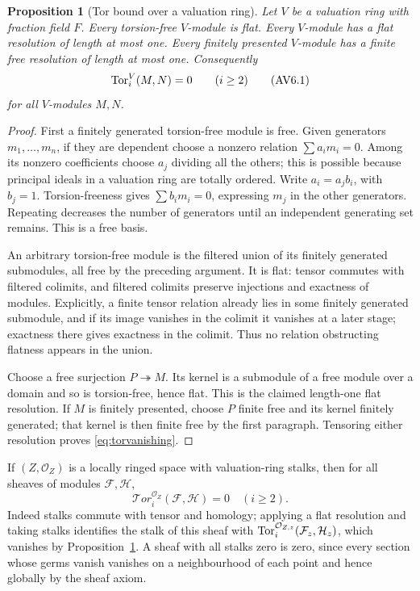 \documentclass[11pt,a4paper]{article}
\newtheorem{proposition}[theorem]{Proposition}
\theoremstyle{definition}\newtheorem{definition}[theorem]{Definition}
\begin{document}
\begin{proposition}[Tor bound over a valuation ring]
\label{prop:valuation-tor}
Let $V$ be a valuation ring with fraction field $F$. Every torsion-free
$V$-module is flat. Every $V$-module has a flat resolution of length at
most one. Every finitely presented $V$-module has a finite free
resolution of length at most one. Consequently
\[
 \operatorname{Tor}_i^V(M,N)=0\qquad(i\ge2)
 \tag{AV6.1}\label{eq:torvanishing}
\]
for all $V$-modules $M,N$.
\end{proposition}
\begin{proof}
First a finitely generated torsion-free module is free. Given generators
$m_1,\ldots,m_n$, if they are dependent choose a nonzero relation
$\sum a_i m_i=0$. Among its nonzero coefficients choose $a_j$ dividing
all the others; this is possible because principal ideals in a valuation
ring are totally ordered. Write $a_i=a_jb_i$, with $b_j=1$.
Torsion-freeness gives $\sum b_i m_i=0$, expressing $m_j$ in the other
generators. Repeating decreases the number of generators until an
independent generating set remains. This is a free basis.

An arbitrary torsion-free module is the filtered union of its finitely
generated submodules, all free by the preceding argument. It is flat:
tensor commutes with filtered colimits, and filtered colimits preserve
injections and exactness of modules. Explicitly, a finite tensor relation
already lies in some finitely generated submodule, and if its image
vanishes in the colimit it vanishes at a later stage; exactness there
gives exactness in the colimit. Thus no relation obstructing flatness
appears in the union.

Choose a free surjection $P\twoheadrightarrow M$. Its kernel is a
submodule of a free module over a domain and so is torsion-free, hence
flat. This is the claimed length-one flat resolution. If $M$ is finitely
presented, choose $P$ finite free and its kernel finitely generated;
that kernel is then finite free by the first paragraph. Tensoring either
resolution proves \eqref{eq:torvanishing}.
\end{proof}

If $(Z,\mathcal O_Z)$ is a locally ringed space with valuation-ring
stalks, then for all sheaves of modules $\mathcal F,\mathcal H$,
\[
 \mathcal{T}or_i^{\mathcal O_Z}(\mathcal F,\mathcal H)=0\quad(i\ge2).
 \tag{AV6.2}\label{eq:sheaf-tor}
\]
Indeed stalks commute with tensor and homology; applying a flat resolution
and taking stalks identifies the stalk of this sheaf with
$\operatorname{Tor}_i^{\mathcal O_{Z,z}}(\mathcal F_z,\mathcal H_z)$, which vanishes
by Proposition~\ref{prop:valuation-tor}. A sheaf with all stalks zero is
zero, since every section whose germs vanish vanishes on a neighbourhood
of each point and hence globally by the sheaf axiom.
\end{document}
